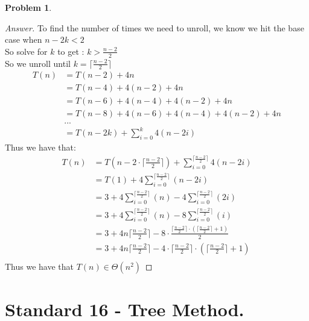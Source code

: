 \documentclass[11pt]{article}
\theoremstyle{definition}
\theoremstyle{definition}
\newtheorem{required}{Problem}
\theoremstyle{definition}
\begin{document}
\begin{required}
\begin{enumerate} [label=(\alph*)]
\begin{proof}[Answer]
To find the number of times we need to unroll, we know we hit the base case when $n-2k <2$\\
So solve for $k$ to get : $k>\frac{n-2}{2}$\\
So we unroll until $k = \lceil\frac{n-2}{2} \rceil$ \\
\begin{align*}
T(n) &= T(n-2)+4n \\
&=T(n-4)+4(n-2)+4n\\
&=T(n-6)+4(n-4)+4(n-2)+4n\\
&=T(n-8)+4(n-6)+4(n-4)+4(n-2)+4n\\
&... \\
						&=T(n-2k)+\sum_{i=0}^{k}4(n-2i) 
\end{align*}
Thus we have that: \\
\begin{align*}
T(n) &=T(n-2\cdot\lceil\frac{n-2}{2} \rceil)+\sum_{i=0}^{\lceil\frac{n-2}{2} \rceil}4(n-2i) \\
&=T(1)+4\sum_{i=0}^{\lceil\frac{n-2}{2} \rceil}(n-2i) \\
&=3+4\sum_{i=0}^{\lceil\frac{n-2}{2} \rceil}(n) -4\sum_{i=0}^{\lceil\frac{n-2}{2} \rceil}(2i)\\
&=3+4\sum_{i=0}^{\lceil\frac{n-2}{2} \rceil}(n) -8\sum_{i=0}^{\lceil\frac{n-2}{2} \rceil}(i)\\
&=3+4n\lceil\frac{n-2}{2} \rceil -8\cdot \frac{\lceil\frac{n-2}{2} \rceil\cdot(\lceil\frac{n-2}{2} \rceil+1)}{2}\\
&=3+4n\lceil\frac{n-2}{2} \rceil -4\cdot {\lceil\frac{n-2}{2} \rceil\cdot(\lceil\frac{n-2}{2} \rceil+1)}\\
\end{align*}
Thus we have that $T(n) \in \Theta(n^2)$



\end{proof}
\end{enumerate}

\end{required}

\newpage
\section{Standard 16 - Tree Method.}
\end{document}
